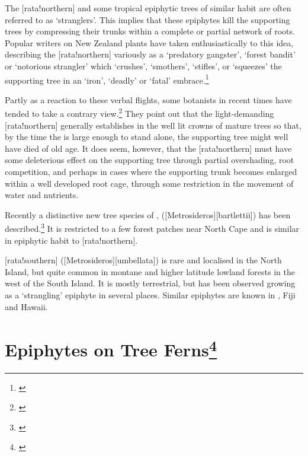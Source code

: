 The [rata!northern] and some tropical epiphytic trees of similar habit are often referred to as `stranglers'.
This implies that these epiphytes kill the supporting trees by compressing their trunks within a complete or partial network of roots.
Popular writers on New Zealand plants have taken enthusiastically to this idea, describing the [rata!northern] variously as a `predatory gangster', `forest bandit' or `notorious strangler' which `crushes', `smothers', `stifles', or `squeezes' the supporting tree in an `iron', `deadly' or `fatal' embrace.\footnote{\cite{druce1971uncle}}

Partly as a reaction to these verbal flights, some botanists in recent times have tended to take a contrary view.\footnote{\cite{zotov1948rata}}
They point out that the light-demanding [rata!northern] generally establishes in the well lit crowns of mature trees so that, by the time the  is large enough to stand alone, the supporting tree might well have died of old age.
It does seem, however, that the [rata!northern] must have some deleterious effect on the supporting tree through partial overshading, root competition, and perhaps in cases where the supporting trunk becomes enlarged within a well developed  root cage, through some restriction in the movement of water and nutrients.

Recently a distinctive new tree species of ,  ([Metrosideros][bartlettii]) has been described.\footnote{\cite{dawson1985metrosideros}}
It is restricted to a few forest patches near North Cape and is similar in epiphytic habit to [rata!northern].

[rata!southern] ([Metrosideros][umbellata]) is rare and localised in the North Island, but quite common in montane and higher latitude lowland forests in the west of the South Island.
It is mostly terrestrial, but has been observed growing as a `strangling' epiphyte in several places.
Similar  epiphytes are known in , Fiji and Hawai{\okina}i.

\section[Epiphytes on Tree Ferns]{Epiphytes on Tree Ferns\thinspace\footnote{\cite{pope1924role}}}

